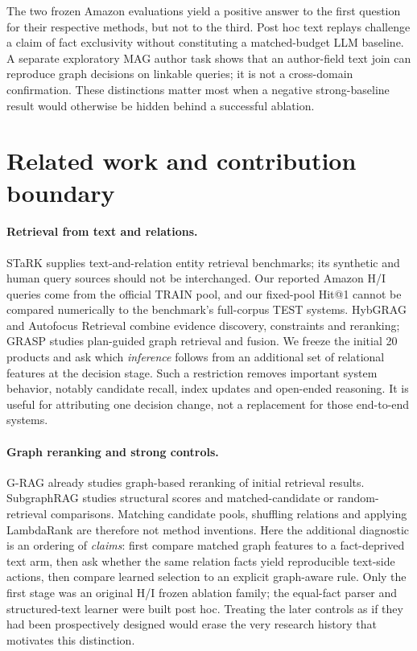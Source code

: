 \documentclass{article}
\begin{document}
The two frozen Amazon evaluations yield a positive answer to the first question
for their respective methods, but not to the third. Post hoc text replays
challenge a claim of fact exclusivity without constituting a matched-budget LLM
baseline. A separate exploratory MAG author task shows that an author-field
text join can reproduce graph decisions on linkable queries; it is not a
cross-domain confirmation. These distinctions matter most when a negative
strong-baseline result would otherwise be hidden behind a successful ablation.

\section{Related work and contribution boundary}
\paragraph{Retrieval from text and relations.}
STaRK \citep{stark} supplies text-and-relation entity retrieval benchmarks;
its synthetic and human query sources should not be interchanged. Our
reported Amazon H/I queries come from the official TRAIN pool, and our
fixed-pool Hit@1 cannot be compared numerically to the benchmark's
full-corpus TEST systems. HybGRAG \citep{hybgrag} and Autofocus Retrieval
\citep{autofocus} combine evidence discovery, constraints and reranking;
GRASP \citep{grasp} studies plan-guided graph retrieval and fusion. We
freeze the initial 20 products and ask which \emph{inference} follows from
an additional set of relational features at the decision stage. Such a
restriction removes important system behavior, notably candidate recall,
index updates and open-ended reasoning. It is useful for attributing one
decision change, not a replacement for those end-to-end systems.

\paragraph{Graph reranking and strong controls.}
G-RAG \citep{grag} already studies graph-based reranking of initial
retrieval results. SubgraphRAG \citep{subgraphrag} studies structural
scores and matched-candidate or random-retrieval comparisons. Matching
candidate pools, shuffling relations and applying LambdaRank
\citep{lightgbm} are therefore not method inventions. Here the
additional diagnostic is an ordering of \emph{claims}: first compare
matched graph features to a fact-deprived text arm, then ask whether
the same relation facts yield reproducible text-side actions, then
compare learned selection to an explicit graph-aware rule. Only the
first stage was an original H/I frozen ablation family; the equal-fact
parser and structured-text learner were built post hoc. Treating the
later controls as if they had been prospectively designed would erase
the very research history that motivates this distinction.
\end{document}
